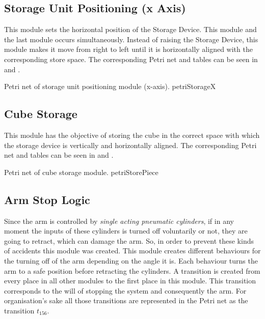 \subsection{Storage Unit Positioning (x Axis)}
This module sets the horizontal position of the Storage Device. This module and
the last module occurs simultaneously. Instead of raising the Storage Device, this
module makes it move from right to left until it is horizontally aligned with the
corresponding store space.  
The corresponding Petri net and tables can be seen in
 and .


{Petri net of storage unit positioning module (x-axis).}
{petriStorageX}
\subsection{Cube Storage}
This module has the objective of storing the cube in the correct space with which the
storage device is vertically and horizontally aligned. 
The corresponding Petri net and tables can be seen in
 and .

\pagebreak

{Petri net of cube storage module.}
{petriStorePiece}
\subsection{Arm Stop Logic}
Since the arm is controlled by \emph{single acting pneumatic cylinders}, if in any
moment the inputs of these cylinders is turned off voluntarily or not, they are
going to retract, which can damage the arm. So, in order to prevent these
kinds of
accidents this module was created.
This module creates different behaviours for the turning off of the arm
depending on the angle it is. 
Each behaviour turns the arm to a safe position before retracting the cylinders.
A transition is created from every
place in all other modules to the first place in this module. This transition
corresponds to the will of stopping the system and consequently the arm. For organisation's
sake all those transitions are represented in the Petri net as the transition $t_{156}$.

